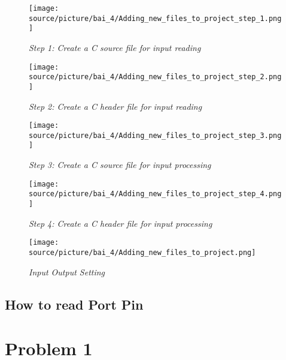 \begin{figure}[!htp]
    \centering
    \texttt{[image: source/picture/bai\_4/Adding\_new\_files\_to\_project\_step\_1.png]}
    \caption{\textit{Step 1: Create a C source file for input reading}}
    \label{bai4_pic_Adding_new_files_to_project_step_1}
\end{figure}

\begin{figure}[!htp]
    \centering
    \texttt{[image: source/picture/bai\_4/Adding\_new\_files\_to\_project\_step\_2.png]}
    \caption{\textit{Step 2: Create a C header file for input reading}}
    \label{bai4_pic_Adding_new_files_to_project_step_2}
\end{figure}

\begin{figure}[!htp]
    \centering
    \texttt{[image: source/picture/bai\_4/Adding\_new\_files\_to\_project\_step\_3.png]}
    \caption{\textit{Step 3: Create a C source file for input processing}}
    \label{bai4_pic_Adding_new_files_to_project_step_3}
\end{figure}

\begin{figure}[!htp]
    \centering
    \texttt{[image: source/picture/bai\_4/Adding\_new\_files\_to\_project\_step\_4.png]}
    \caption{\textit{Step 4: Create a C header file for input processing}}
    \label{bai4_pic_Adding_new_files_to_project_step_4}
\end{figure}

\begin{figure}[!htp]
    \centering
    \texttt{[image: source/picture/bai\_4/Adding\_new\_files\_to\_project.png]}
    \caption{\textit{Input Output Setting}}
    \label{bai4_pic_Adding_new_files_to_project}
\end{figure}


\subsection{How to read Port Pin}

\section{Problem 1}


